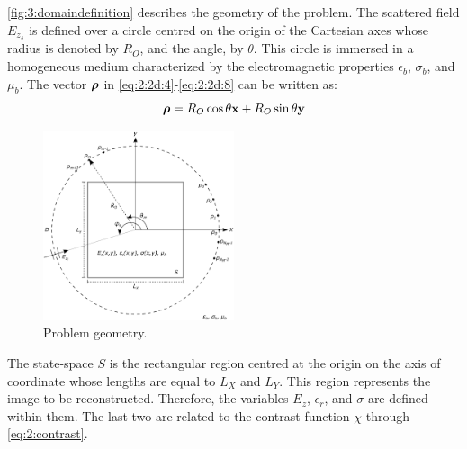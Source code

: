 	 	\autoref{fig:3:domaindefinition} describes the geometry of the problem. The scattered field $E_{z_s}$ is defined over a circle centred on the origin of the Cartesian axes whose radius is denoted by $R_O$, and the angle, by $\theta$. This circle is immersed in a homogeneous medium characterized by the electromagnetic properties $\epsilon_b$, $\sigma_b$, and $\mu_b$. The vector $\boldsymbol{\rho}$ in \eqref{eq:2:2d:4}-\eqref{eq:2:2d:8} can be written as:
	 	\begin{equation}
	 		\boldsymbol{\rho} = R_O\cos\theta\mathbf{x} + R_O\sin\theta\mathbf{y} \label{eq:3:definition:1}
	 	\end{equation}
		\begin{figure}[!b]
			\centering
			\includegraphics[width=0.5\textwidth]{./figuras/domaindefinition}
			\caption{Problem geometry.}
			\label{fig:3:domaindefinition}
		\end{figure}
 	
 		The state-space $S$ is the rectangular region centred at the origin on the axis of coordinate whose lengths are equal to $L_X$ and $L_Y$. This region represents the image to be reconstructed. Therefore, the variables $E_z$, $\epsilon_r$, and $\sigma$ are defined within them. The last two are related to the contrast function $\chi$ through \eqref{eq:2:contrast}.
 		
